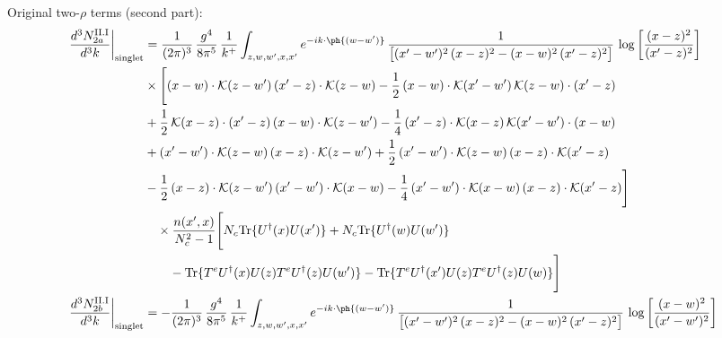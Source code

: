 Original two-$\rho$ terms (second part):
\begin{align}
\frac{d^{3}N^{\rm II.I}_{2a}}{d^{3}k}\bigg|_{\rm singlet}&=\frac{1}{(2\pi)^{3}}\,\frac{g^{4}}{8\pi^{5}}\,\frac{1}{k^{+}}\int_{z,w,w^{\prime},x,x^{\prime}}e^{-ik\cdot\ph{(w-w^{\prime})}}\,\frac{1}{\big[(x^{\prime}-w^{\prime})^{2}\,(x-z)^{2}-(x-w)^{2}\,(x^{\prime}-z)^{2}\big]}\,\log\left[\frac{(x-z)^{2}}{(x^{\prime}-z)^{2}}\right]\notag\\
&\times\Bigg[(x-w)\cdot\mathcal{K}(z-w^{\prime})\,(x^{\prime}-z)\cdot\mathcal{K}(z-w)-\frac{1}{2}\,(x-w)\cdot\mathcal{K}(x^{\prime}-w^{\prime})\,\mathcal{K}(z-w)\cdot(x^{\prime}-z)\notag \\ & +\frac{1}{2}\,\mathcal{K}(x-z)\cdot(x^{\prime}-z)\,(x-w)\cdot\mathcal{K}(z-w^{\prime}) -\frac{1}{4}\,(x^{\prime}-z)\cdot\mathcal{K}(x-z)\,\mathcal{K}(x^{\prime}-w^{\prime})\cdot(x-w)\notag \\ & +(x^{\prime}-w^{\prime})\cdot\mathcal{K}(z-w)\,(x-z)\cdot\mathcal{K}(z-w^{\prime})+\frac{1}{2}\,(x^{\prime}-w^{\prime})\cdot\mathcal{K}(z-w)\,(x-z)\cdot\mathcal{K}(x^{\prime}-z)\notag \\ & -\frac{1}{2}\,(x-z)\cdot\mathcal{K}(z-w^{\prime})\,(x^{\prime}-w^{\prime})\cdot\mathcal{K}(x-w)-\frac{1}{4}\,(x^{\prime}-w^{\prime})\cdot\mathcal{K}(x-w)\,(x-z)\cdot\mathcal{K}(x^{\prime}-z)\Bigg]\notag\\ &\quad\times\frac{n(x',x)}{N_{c}^{2}-1}\Bigg[N_{c}{\rm Tr}\{U^{\dagger}(x)U(x')\}+N_{c}{\rm Tr}\{U^{\dagger}(w)U(w')\}\notag\\ &\qquad-{\rm Tr}\{T^{e}U^{\dagger}(x)U(z)T^{e}U^{\dagger}(z)U(w')\}-{\rm Tr}\{T^{e}U^{\dagger}(x')U(z)T^{e}U^{\dagger}(z)U(w)\}\Bigg]\\
\frac{d^{3}N^{\rm II.I}_{2b}}{d^{3}k}\bigg|_{\rm singlet}&= -\frac{1}{(2\pi)^{3}}\,\frac{g^{4}}{8\pi^{5}}\,\frac{1}{k^{+}}\int_{z,w,w^{\prime},x,x^{\prime}}e^{-ik\cdot\ph{(w-w^{\prime})}}\,\frac{1}{\big[(x^{\prime}-w^{\prime})^{2}\,(x-z)^{2}-(x-w)^{2}\,(x^{\prime}-z)^{2}\big]}\,\log\left[\frac{(x-w)^{2}}{(x^{\prime}-w^{\prime})^{2}}\right]\notag\\

\end{align}
